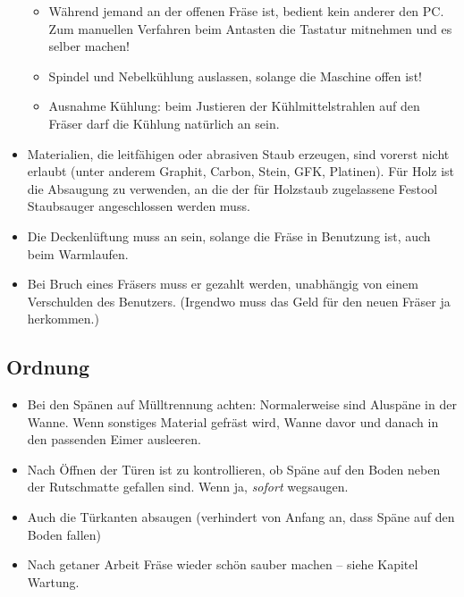 \documentclass{\basedir/fablab-document}
\begin{document}
\begin{itemize}
\begin{itemize}
  \item Während jemand an der offenen Fräse ist, bedient kein anderer den PC. Zum manuellen Verfahren beim Antasten die Tastatur mitnehmen und es selber machen!
  \item Spindel und Nebelkühlung auslassen, solange die Maschine offen ist!
  \item Ausnahme Kühlung: beim Justieren der Kühlmittelstrahlen auf den Fräser darf die Kühlung natürlich an sein.
 \end{itemize}
 \item Materialien, die leitfähigen oder abrasiven Staub erzeugen, sind vorerst nicht erlaubt (unter anderem Graphit, Carbon, Stein, GFK, Platinen). Für Holz ist die Absaugung zu verwenden, an die der für Holzstaub zugelassene Festool Staubsauger angeschlossen werden muss.
 \item Die Deckenlüftung muss an sein, solange die Fräse in Benutzung ist, auch beim Warmlaufen.
 \item Bei Bruch eines Fräsers muss er gezahlt werden, unabhängig von einem Verschulden des Benutzers. (Irgendwo muss das Geld für den neuen Fräser ja herkommen.)
\end{itemize}
\subsection{Ordnung} \label{ordnung}
\begin{itemize}
\item Bei den Spänen auf Mülltrennung achten: Normalerweise sind Aluspäne in der Wanne. Wenn sonstiges Material gefräst wird, Wanne davor und danach in den passenden Eimer ausleeren.
\item Nach Öffnen der Türen ist zu kontrollieren, ob Späne auf den Boden neben der Rutschmatte gefallen sind. Wenn ja, \emph{sofort} wegsaugen.
 \item Auch die Türkanten absaugen (verhindert von Anfang an, dass Späne auf den Boden fallen)
 \item Nach getaner Arbeit Fräse wieder schön sauber machen -- siehe Kapitel Wartung.
\end{itemize}

\clearpage
\end{document}
